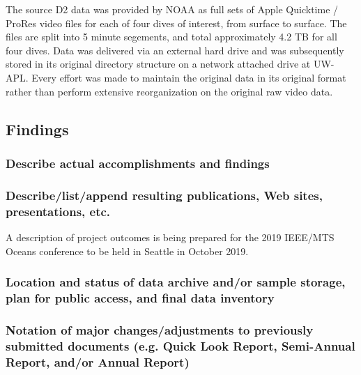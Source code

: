 \documentclass[letterpaper,12pt]{article}
\begin{document}
The source D2 data was provided by NOAA as full sets of Apple Quicktime / ProRes video files for each of four dives of interest, from surface to surface.   The files are split into 5 minute segements, and total approximately 4.2 TB for all four dives.   Data was delivered via an external hard drive and was subsequently stored in its original directory structure on a network attached drive at UW-APL.  Every effort was made to maintain the original data in its original format rather than perform extensive reorganization on the original raw video data.

\subsection{Findings}
\subsubsection*{Describe actual accomplishments and findings}




\subsubsection*{Describe/list/append resulting publications, Web sites, presentations, etc.}


A description of project outcomes is being prepared for the 2019 IEEE/MTS Oceans conference to be held in Seattle in October 2019.

\subsubsection*{Location and status of data archive and/or sample storage, plan for public access, and final data inventory} 



\subsubsection*{Notation of major changes/adjustments to previously submitted documents (e.g.    Quick Look Report, Semi-Annual Report, and/or Annual Report)}
\end{document}
